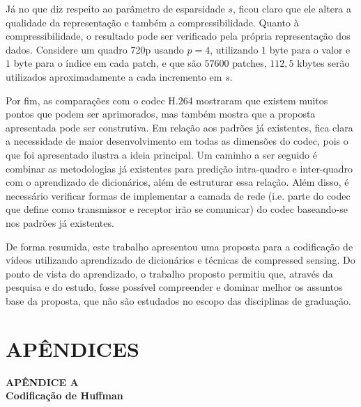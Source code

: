 \documentclass[cic,tc]{iiufrgs}
\begin{document}
Já no que diz respeito ao parâmetro de esparsidade $s$, ficou claro que ele altera a qualidade da representação 
e também a compressibilidade.
Quanto à compressibilidade, o resultado pode ser verificado pela própria representação dos dados.
Considere um quadro 720p usando $p=4$, utilizando $1$ byte para o valor e $1$ byte para o índice em cada 
patch, e que são $57600$ patches, $112,5$ kbytes serão utilizados aproximadamente a cada incremento
em $s$.

Por fim, as comparações com o codec H.264 mostraram que existem muitos pontos que podem ser 
aprimorados, mas também mostra que a proposta apresentada pode ser construtiva.
Em relação aos padrões já existentes, fica clara a necessidade de maior desenvolvimento em 
todas as dimensões do codec, pois o que foi apresentado ilustra a ideia principal.
Um caminho a ser seguido é combinar as metodologias já existentes para predição intra-quadro 
e inter-quadro com o aprendizado de dicionários, além de estruturar essa relação.
Além disso, é necessário verificar formas de implementar a camada de rede 
(i.e. parte do codec que define como transmissor e receptor irão se comunicar) 
do codec baseando-se 
nos padrões já existentes.

De forma resumida, este trabalho apresentou uma proposta para a codificação de vídeos 
utilizando aprendizado de dicionários e técnicas de compressed sensing.
Do ponto de vista do aprendizado, o trabalho proposto permitiu que, 
através da pesquisa e do estudo, fosse possível compreender e dominar 
melhor os assuntos base da proposta, que não são estudados no escopo das disciplinas de graduação.


% 




\chapter*{APÊNDICES}
{
    \centering
    \textbf{APÊNDICE A} \\
    \textbf{Codificação de Huffman} \par
}
\vspace{1em}
\end{document}
